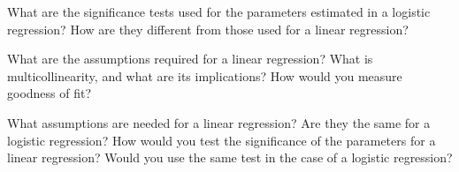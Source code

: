 \documentclass[answers]{exam}
\begin{document}
\begin{questions}
\begin{solution}[.2in]
\end{solution}

\question %
What are the significance tests used for the parameters estimated in a logistic regression?
How are they different from those used for a linear regression?

\question
What are the assumptions required for a linear regression?
What is multicollinearity, and what are its implications?
How would you measure goodness of fit?

\question
What assumptions are needed for a linear regression?
Are they the same for a logistic regression?
How would you test the significance of the parameters for a linear regression?
Would you use the same test in the case of a logistic regression?
\end{questions}
\end{document}
